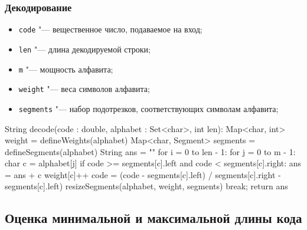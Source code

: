 \documentclass[12pt]{article}
\begin{document}
\subsubsection*{Декодирование}
\begin{itemize}
	\item \verb'code' "--- вещественное число, подаваемое на вход;
	\item \verb'len' "--- длина декодируемой строки;
	\item \verb'm' "--- мощность алфавита;
   \item \verb'weight' "--- веса символов алфавита;
	\item \verb'segments' "--- набор подотрезков, соответствующих символам алфавита;
\end{itemize}
\newpage
\begin{listing}{1}
String decode(code : double, alphabet : Set<char>, int len):
    Map<char, int> weight = defineWeights(alphabet)
    Map<char, Segment> segments = defineSegments(alphabet)
    String ans = ""
    for i = 0 to len - 1:
        for j = 0 to m - 1:
            char c  = alphabet[j]
            if code >= segments[c].left and code < segments[c].right:
                ans = ans + c
                weight[c]++
                code = (code - segments[c].left) / 
segments[c].right - segments[c].left)
                resizeSegments(alphabet, weight, segments)
                break;
    return ans
\end{listing}

\subsection*{Оценка минимальной и максимальной длины кода}
\end{document}
